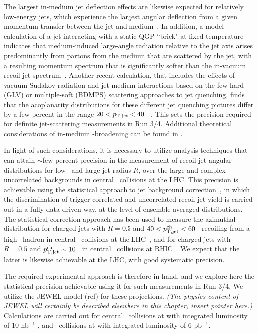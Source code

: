 The largest in-medium jet deflection effects are likewise expected for relatively low-energy jets, which experience the largest angular deflection from a given momentum transfer between the jet and medium~\cite{DEramo:2018eoy,Gyulassy:2018qhr}. In addition, a model calculation of a jet interacting with a static QGP ``brick" at fixed temperature indicates that medium-induced large-angle radiation relative to the jet axis arises predominantly from partons from the medium that are scattered by the jet, with a resulting momentum spectrum that is significantly softer than the in-vacuum recoil jet spectrum~\cite{DEramo:2018eoy}. Another recent calculation, that includes the effects of vacuum Sudakov radiation and jet-medium interactions based on the few-hard (GLV) or multiple-soft (BDMPS) scattering approaches to jet quenching, finds that the acoplanarity distributions for these different jet quenching pictures differ by a few percent in the range $20<p_{\mathrm{T,jet}}<40$ \gevc~\cite{Gyulassy:2018qhr}. This sets the precision required for definite jet-scattering measurements in Run 3/4. Additional theoretical considerations of in-medium \pT-broadening can be found in \cite{Zakharov:2018rst,Ghiglieri:2018ltw}.

In light of such considerations, it is necessary to utilize analysis techniques that can attain $\sim$few percent precision in the measurement of recoil jet angular distributions for low \ptjet\ and large jet radius $R$, over the large and complex uncorrelated backgrounds in central \PbPb\ collisions at the LHC. This precision is achievable using the statistical approach to jet background correction~\cite{Adam:2015doa,Adamczyk:2017yhe}, in which the discrimination of trigger-correlated and uncorrelated recoil jet yield is carried out in a fully data-driven way, at the level of ensemble-averaged distributions. The statistical correction approach has been used to measure the azimuthal distribution for charged jets with $R=0.5$ and $40<p_{\mathrm{T,jet}}^{\mathrm{ch}}<60$ \gevc\ recoiling from a high-\pt\ hadron in central \PbPb\ collisions at the LHC~\cite{Adam:2015doa}, and for charged jets with $R=0.5$ and $p_{\mathrm{T,jet}}^{\mathrm{ch}}\sim10$ \gevc\ in central \AuAu\ collisions at RHIC~\cite{Adamczyk:2017yhe}. We expect that the latter is likewise achievable at the LHC, with good systematic precision. 

The required experimental approach is therefore in hand, and we explore here the statistical precision achievable using it for such measurements in Run 3/4. 
We utilize the JEWEL model (ref) for these projections. {\it (The physics content of JEWEL will certainly be described elsewhere in this chapter, insert pointer here.)} Calculations are carried out for central \PbPb\ collisions at  with integrated luminosity of 10 nb$^{-1}$ , and \pp\ collisions at  with integrated luminosity of 6 pb$^{-1}$. 

